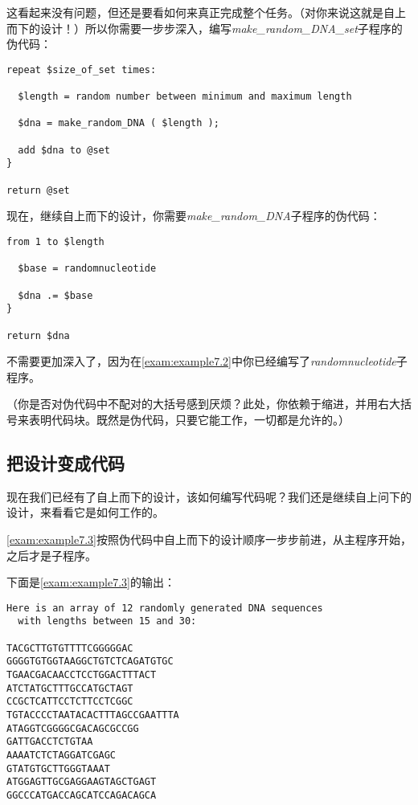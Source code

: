 这看起来没有问题，但还是要看如何来真正完成整个任务。（对你来说这就是自上而下的设计！）所以你需要一步步深入，编写\textit{make\_random\_DNA\_set}子程序的伪代码：

\begin{lstlisting}
repeat $size_of_set times:

  $length = random number between minimum and maximum length

  $dna = make_random_DNA ( $length );

  add $dna to @set
}

return @set
\end{lstlisting}

现在，继续自上而下的设计，你需要\textit{make\_random\_DNA}子程序的伪代码：

\begin{lstlisting}
from 1 to $length

  $base = randomnucleotide

  $dna .= $base
}

return $dna
\end{lstlisting}

不需要更加深入了，因为在\autoref{exam:example7.2}中你已经编写了\textit{randomnucleotide}子程序。

（你是否对伪代码中不配对的大括号感到厌烦？此处，你依赖于缩进，并用右大括号来表明代码块。既然是伪代码，只要它能工作，一切都是允许的。）

\subsection{把设计变成代码}
现在我们已经有了自上而下的设计，该如何编写代码呢？我们还是继续自上问下的设计，来看看它是如何工作的。

\autoref{exam:example7.3}按照伪代码中自上而下的设计顺序一步步前进，从主程序开始，之后才是子程序。



下面是\autoref{exam:example7.3}的输出：

\begin{lstlisting}
Here is an array of 12 randomly generated DNA sequences
  with lengths between 15 and 30:

TACGCTTGTGTTTTCGGGGGAC
GGGGTGTGGTAAGGCTGTCTCAGATGTGC
TGAACGACAACCTCCTGGACTTTACT
ATCTATGCTTTGCCATGCTAGT
CCGCTCATTCCTCTTCCTCGGC
TGTACCCCTAATACACTTTAGCCGAATTTA
ATAGGTCGGGGCGACAGCGCCGG
GATTGACCTCTGTAA
AAAATCTCTAGGATCGAGC
GTATGTGCTTGGGTAAAT
ATGGAGTTGCGAGGAAGTAGCTGAGT
GGCCCATGACCAGCATCCAGACAGCA
\end{lstlisting}

